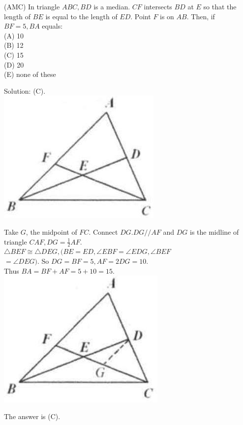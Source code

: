 \documentclass{article}
\begin{document}
(AMC) In triangle \(A B C, B D\) is a median. \(C F\) intersects \(B D\) at \(E\) so that the length of \(B E\) is equal to the length of \(E D\). Point \(F\) is on \(A B\). Then, if \(B F=5, B A\) equals:\\
(A) 10\\
(B) 12\\
(C) 15\\
(D) 20\\
(E) none of these

Solution: (C).\\
\centering
\includegraphics[width=\textwidth]{images/035(1).jpg}

Take \(G\), the midpoint of \(F C\). Connect \(D G . D G / / A F\) and \(D G\) is the midline of triangle \(C A F, D G=\frac{1}{2} A F\).\\
\(\triangle B E F \cong \triangle D E G,(B E=E D, \angle E B F=\angle E D G, \angle B E F\)\\
\(=\angle D E G)\). So \(D G=B F=5, A F=2 D G=10\).\\
Thus \(B A=B F+A F=5+10=15\).\\
\centering
\includegraphics[width=\textwidth]{images/035(2).jpg}

The answer is (C).\\
\end{document}
